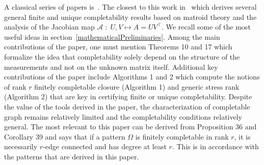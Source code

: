 \documentclass[12pt]{article}
\begin{document}
A classical series of papers is~\cite{kiraly2012combinatorial, kiraly2013error, kiraly2015algebraic}.  The closest to this work in~\cite{kiraly2015algebraic} which derives several general finite and unique completability results based on matroid theory and the analysis of the Jacobian map $\mathcal{A}\;:\; U,V\mapsto A = UV^\intercal$.  We recall some of the most useful ideas in section~\ref{mathematicalPreliminaries}.  Among the main contributions of the paper, one must mention Theorems 10 and 17 which formalize the idea that completability solely depend on the structure of the measurements and not on the unknown matrix itself.  Additional key contributions of the paper include Algorithms 1 and 2 which compute the notions of rank $r$ finitely completable closure (Algorithm 1) and generic stress rank (Algorithm 2) that are key in certifying finite or unique completability.  Despite the value of the tools derived in the paper,  the characterization of completable graph remains relatively limited and the completability conditions relatively general.  The most relevant to this paper can be derived from Proposition 36 and Corollary 39 and says that if a pattern $\Omega$ is finitely completable in rank $r$, it is necessarily $r$-edge connected and has degree at least $r$.  This is in accordance with the patterns that are derived in this paper. 
\end{document}

